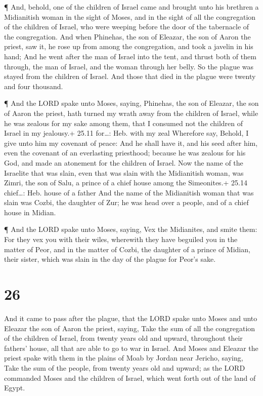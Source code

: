  ¶ And, behold, one of the children of Israel came and
brought unto his brethren a Midianitish woman in the sight of Moses, and
in the sight of all the congregation of the children of Israel, who were
weeping before the door of the tabernacle of the congregation.
 And when Phinehas, the son of Eleazar, the son of Aaron the
priest, saw it, he rose up from among the congregation, and took a
javelin in his hand;  And he went after the man of Israel
into the tent, and thrust both of them through, the man of Israel, and
the woman through her belly. So the plague was stayed from the children
of Israel.  And those that died in the plague were twenty
and four thousand.

 ¶ And the LORD spake unto Moses, saying, 
Phinehas, the son of Eleazar, the son of Aaron the priest, hath turned
my wrath away from the children of Israel, while he was zealous for my
sake among them, that I consumed not the children of Israel in my
jealousy.+ 25.11 for\ldots: Heb. with my zeal  Wherefore
say, Behold, I give unto him my covenant of peace:  And he
shall have it, and his seed after him, even the covenant of an
everlasting priesthood; because he was zealous for his God, and made an
atonement for the children of Israel.  Now the name of the
Israelite that was slain, even that was slain with the Midianitish
woman, was Zimri, the son of Salu, a prince of a chief house among the
Simeonites.+ 25.14 chief\ldots: Heb. house of a father  And
the name of the Midianitish woman that was slain was Cozbi, the daughter
of Zur; he was head over a people, and of a chief house in Midian.

 ¶ And the LORD spake unto Moses, saying,  Vex
the Midianites, and smite them:  For they vex you with
their wiles, wherewith they have beguiled you in the matter of Peor, and
in the matter of Cozbi, the daughter of a prince of Midian, their
sister, which was slain in the day of the plague for Peor's sake.

\hypertarget{section-25}{%
\section{26}\label{section-25}}

 And it came to pass after the plague, that the LORD spake
unto Moses and unto Eleazar the son of Aaron the priest, saying,
 Take the sum of all the congregation of the children of
Israel, from twenty years old and upward, throughout their fathers'
house, all that are able to go to war in Israel.  And Moses
and Eleazar the priest spake with them in the plains of Moab by Jordan
near Jericho, saying,  Take the sum of the people, from
twenty years old and upward; as the LORD commanded Moses and the
children of Israel, which went forth out of the land of Egypt.

